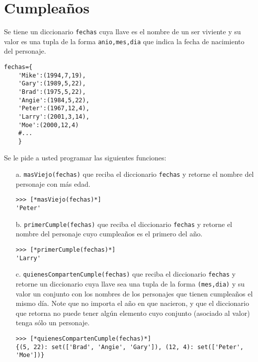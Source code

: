 \section{Cumpleaños}
Se tiene un diccionario \texttt{fechas} cuya llave es el nombre de un ser viviente y su valor es una tupla de la forma \texttt{anio,mes,dia} que indica la fecha de nacimiento del personaje.

\begin{lstlisting}[style=consola]
fechas={
    'Mike':(1994,7,19),
    'Gary':(1989,5,22),
    'Brad':(1975,5,22),
    'Angie':(1984,5,22),
    'Peter':(1967,12,4),
    'Larry':(2001,3,14),
    'Moe':(2000,12,4)
    #...
    }
\end{lstlisting}

Se le pide a usted programar las siguientes funciones:

\begin{itemize}
\item[a.] \texttt{masViejo(fechas)} que reciba el diccionario \texttt{fechas} y retorne el nombre del personaje con más edad.

\begin{lstlisting}[style=consola]
>>> [*masViejo(fechas)*]
'Peter'
\end{lstlisting}

\item[b.] \texttt{primerCumple(fechas)} que reciba el diccionario \texttt{fechas} y retorne el nombre del personaje cuyo cumpleaños es el primero del año.

\begin{lstlisting}[style=consola]
>>> [*primerCumple(fechas)*]
'Larry'
\end{lstlisting}

\item[c.] \texttt{quienesCompartenCumple(fechas)} que reciba el diccionario \texttt{fechas} y retorne un diccionario cuya llave sea una tupla de la forma \texttt{(mes,dia)} y su valor un conjunto con los nombres de los personajes que tienen cumpleaños el mismo día. Note que no importa el año en que nacieron, y que el diccionario que retorna no puede tener algún elemento cuyo conjunto (asociado al valor) tenga sólo un personaje.

\begin{lstlisting}[style=consola]
>>> [*quienesCompartenCumple(fechas)*]
{(5, 22): set(['Brad', 'Angie', 'Gary']), (12, 4): set(['Peter', 'Moe'])}
\end{lstlisting}

\end{itemize}
